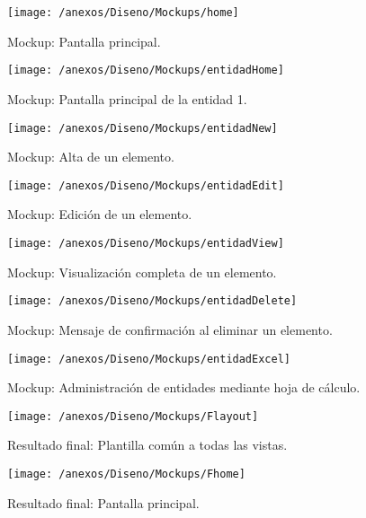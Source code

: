 \begin{figure}[h]
	\centering
	\texttt{[image: /anexos/Diseno/Mockups/home]}
	\caption{Mockup: Pantalla principal.}
	\label{img:home}
\end{figure}

\begin{figure}[h]
	\centering
	\texttt{[image: /anexos/Diseno/Mockups/entidadHome]}
	\caption{Mockup: Pantalla principal de la entidad 1.}
	\label{img:entidadHome}
\end{figure}

\begin{figure}[h]
	\centering
	\texttt{[image: /anexos/Diseno/Mockups/entidadNew]}
	\caption{Mockup: Alta de un elemento.}
	\label{img:entidadNew}
\end{figure}

\begin{figure}[h]
	\centering
	\texttt{[image: /anexos/Diseno/Mockups/entidadEdit]}
	\caption{Mockup: Edición de un elemento.}
	\label{img:entidadEdit}
\end{figure}

\begin{figure}[h]
	\centering
	\texttt{[image: /anexos/Diseno/Mockups/entidadView]}
	\caption{Mockup: Visualización completa de un elemento.}
	\label{img:entidadView}
\end{figure}

\begin{figure}[h]
	\centering
	\texttt{[image: /anexos/Diseno/Mockups/entidadDelete]}
	\caption{Mockup: Mensaje de confirmación al eliminar un elemento.}
	\label{img:entidadDelete}
\end{figure}

\begin{figure}[h]
	\centering
	\texttt{[image: /anexos/Diseno/Mockups/entidadExcel]}
	\caption{Mockup: Administración de entidades mediante hoja de cálculo.}
	\label{img:entidadExcel}
\end{figure}


\begin{figure}[h]
	\centering
	\texttt{[image: /anexos/Diseno/Mockups/Flayout]}
	\caption{Resultado final: Plantilla común a todas las vistas.}
	\label{img:Flayout}
\end{figure}

\begin{figure}[h]
	\centering
	\texttt{[image: /anexos/Diseno/Mockups/Fhome]}
	\caption{Resultado final: Pantalla principal.}
	\label{img:Fhome}
\end{figure}

